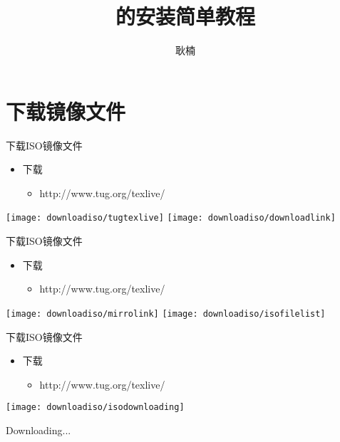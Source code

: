 \documentclass[fontset = none, t]{ctexbeamer}
\title[\TeXLive 的安装]{\TeXLive 的安装简单教程}
\author[N. Geng]{耿楠}
\institute[教发中心]{西北农林科技大学教学发展中心}
\date{\tosemester}
\begin{document}
\maketitle

\section[下载\TeXLive]{下载\TeXLive 镜像文件}
\begin{frame}{下载\TeXLive}{ISO镜像文件}
  \begin{itemize}
  \item 下载
    \begin{itemize}
    \item http://www.tug.org/texlive/
    \end{itemize}
  \end{itemize}  
  \centering
  \vfill
  \texttt{[image: downloadiso/tugtexlive]}\quad
  \texttt{[image: downloadiso/downloadlink]}
  \vfill
\end{frame}
\begin{frame}{下载\TeXLive}{ISO镜像文件}  
  \begin{itemize}
  \item 下载
    \begin{itemize}
    \item http://www.tug.org/texlive/
    \end{itemize}
  \end{itemize}
  \centering
  \vfill
  \texttt{[image: downloadiso/mirrolink]}\quad
  \texttt{[image: downloadiso/isofilelist]}
  \vfill
\end{frame}
\begin{frame}{下载\TeXLive}{\tl ISO镜像文件}
  \begin{itemize}
  \item 下载
    \begin{itemize}
    \item
      http://www.tug.org/texlive/
      
    \end{itemize}
  \end{itemize}
  \centering
  \vfill
  \texttt{[image: downloadiso/isodownloading]}
  \vfill
\end{frame}
\begin{frame}
  Downloading...
\end{frame}
\end{document}
